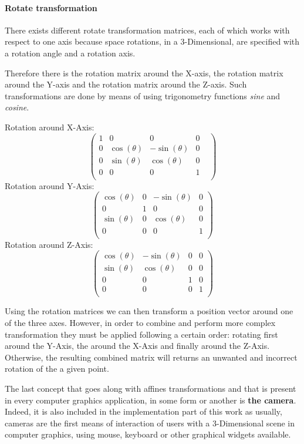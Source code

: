 \documentclass[12pt,a4paper]{extarticle}
\newcommand{\linespace}{\vspace{8pt}}
\begin{document}
\paragraph{Rotate transformation} There exists different rotate transformation matrices, each of which works with respect to one axis because space rotations, in a 3-Dimensional, are specified with a rotation angle and a rotation axis.

Therefore there is the rotation matrix around the X-axis, the rotation matrix around the Y-axis and the rotation matrix around the Z-axis. Such transformations are done by means of using trigonometry functions \textit{sine} and \textit{cosine}.

Rotation around X-Axis:
\[
\begin{pmatrix}
1&0&0&0&\\
0&\cos(\theta)& -\sin(\theta) & 0\\
0&\sin(\theta)&\cos(\theta)&0\\
0&0&0&1\\
\end{pmatrix}
\]
Rotation around Y-Axis:
\[
\begin{pmatrix}
\cos(\theta) & 0 &-\sin(\theta)& 0\\
0&1&0&0\\
\sin(\theta)&0&\cos(\theta)&0\\
0&0&0&1\\
\end{pmatrix}
\]
Rotation around Z-Axis:
\[
\begin{pmatrix}
\cos(\theta)& -\sin(\theta) & 0 & 0\\
\sin(\theta)&\cos(\theta)&0&0\\
0&0&1&0\\
0&0&0&1\\
\end{pmatrix}
\]


Using the rotation matrices we can then transform a position vector around one of the three axes. However, in order to combine and perform more complex transformation they must be applied following a certain order: rotating first around the Y-Axis, the around the X-Axis and finally around the Z-Axis. Otherwise, the resulting combined matrix will returns an unwanted and incorrect rotation of the a given point.
\linespace

The last concept that goes along with affines transformations and that is present in every computer graphics application, in some form or another is \textbf{the camera}. Indeed, it is also included in the implementation part of this work as usually, cameras are the first means of interaction of users with a 3-Dimensional scene %
in computer graphics, using mouse, keyboard or other graphical widgets available.
\linespace
\end{document}
